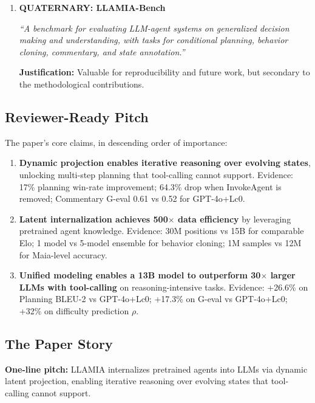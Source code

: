 \begin{enumerate}[leftmargin=*, itemsep=4pt]
    \textbf{Justification:} These are the consequences that validate Contributions 1 and 2. Strong empirically but derivative conceptually.
    
    \item \textbf{QUATERNARY: LLAMIA-Bench}
    
    \textit{``A benchmark for evaluating LLM-agent systems on generalized decision making and understanding, with tasks for conditional planning, behavior cloning, commentary, and state annotation.''}
    
    \textbf{Justification:} Valuable for reproducibility and future work, but secondary to the methodological contributions.
\end{enumerate}

\subsection{Reviewer-Ready Pitch}

The paper's core claims, in descending order of importance:

\begin{enumerate}[leftmargin=*, itemsep=3pt]
    \item \textbf{Dynamic projection enables iterative reasoning over evolving states}, unlocking multi-step planning that tool-calling cannot support. Evidence: 17\% planning win-rate improvement; 64.3\% drop when InvokeAgent is removed; Commentary G-eval 0.61 vs 0.52 for GPT-4o+Lc0.
    
    \item \textbf{Latent internalization achieves 500$\times$ data efficiency} by leveraging pretrained agent knowledge. Evidence: 30M positions vs 15B for comparable Elo; 1 model vs 5-model ensemble for behavior cloning; 1M samples vs 12M for Maia-level accuracy.
    
    \item \textbf{Unified modeling enables a 13B model to outperform 30$\times$ larger LLMs with tool-calling} on reasoning-intensive tasks. Evidence: +26.6\% on Planning BLEU-2 vs GPT-4o+Lc0; +17.3\% on G-eval vs GPT-4o+Lc0; +32\% on difficulty prediction $\rho$.
\end{enumerate}

\subsection{The Paper Story}

\textbf{One-line pitch:} LLAMIA internalizes pretrained agents into LLMs via dynamic latent projection, enabling iterative reasoning over evolving states that tool-calling cannot support.

